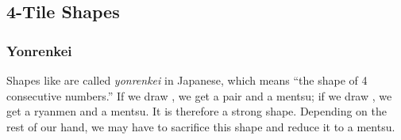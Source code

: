 \documentclass[12pt]{article}
\begin{document}
%
%
%
%
%
%
%
%
%



\subsection{4-Tile Shapes}

\subsubsection{Yonrenkei} \label{subsub:yonrenkei}

Shapes like  are called \textit{yonrenkei} in Japanese, which means ``the shape of 4 consecutive numbers.'' If we draw , we get a pair and a mentsu; if we draw , we get a ryanmen and a mentsu. It is therefore a strong shape. Depending on the rest of our hand, we may have to sacrifice this shape and reduce it to a mentsu.
\end{document}

